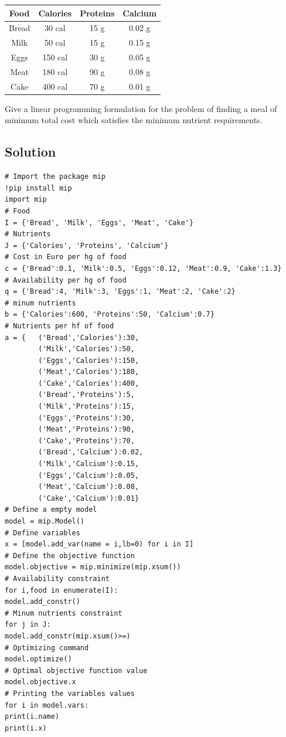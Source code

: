 \documentclass[12pt, a4paper]{report}
\begin{document}
        \begin{table}[H]
            \centering
            \begin{tabular}{|cccc|}
            \hline
            \textbf{Food}               & \textbf{Calories}            & \textbf{Proteins}         & \textbf{Calcium} \\ \hline
            \multicolumn{1}{|c|}{Bread} & \multicolumn{1}{c|}{30 cal}  & \multicolumn{1}{c|}{15 g} & 0.02 g           \\
            \multicolumn{1}{|c|}{Milk}  & \multicolumn{1}{c|}{50 cal}  & \multicolumn{1}{c|}{15 g} & 0.15 g           \\
            \multicolumn{1}{|c|}{Eggs}  & \multicolumn{1}{c|}{150 cal} & \multicolumn{1}{c|}{30 g} & 0.05 g           \\
            \multicolumn{1}{|c|}{Meat}  & \multicolumn{1}{c|}{180 cal} & \multicolumn{1}{c|}{90 g} & 0.08 g           \\
            \multicolumn{1}{|c|}{Cake}  & \multicolumn{1}{c|}{400 cal} & \multicolumn{1}{c|}{70 g} & 0.01 g           \\ \hline
            \end{tabular}
        \end{table}
        Give a linear programming formulation for the problem of finding a meal of minimum total cost which satisfies the minimum nutrient requirements.
    \subsection*{Solution}
        \begin{lstlisting}[style=Python]
# Import the package mip
!pip install mip
import mip
# Food
I = {'Bread', 'Milk', 'Eggs', 'Meat', 'Cake'}
# Nutrients
J = {'Calories', 'Proteins', 'Calcium'}
# Cost in Euro per hg of food
c = {'Bread':0.1, 'Milk':0.5, 'Eggs':0.12, 'Meat':0.9, 'Cake':1.3}
# Availability per hg of food
q = {'Bread':4, 'Milk':3, 'Eggs':1, 'Meat':2, 'Cake':2}
# minum nutrients 
b = {'Calories':600, 'Proteins':50, 'Calcium':0.7}
# Nutrients per hf of food
a = {   ('Bread','Calories'):30,
        ('Milk','Calories'):50,
        ('Eggs','Calories'):150,
        ('Meat','Calories'):180,
        ('Cake','Calories'):400,
        ('Bread','Proteins'):5,
        ('Milk','Proteins'):15,
        ('Eggs','Proteins'):30,
        ('Meat','Proteins'):90,
        ('Cake','Proteins'):70,
        ('Bread','Calcium'):0.02,
        ('Milk','Calcium'):0.15,
        ('Eggs','Calcium'):0.05,
        ('Meat','Calcium'):0.08,
        ('Cake','Calcium'):0.01}
# Define a empty model
model = mip.Model()
# Define variables
x = [model.add_var(name = i,lb=0) for i in I]
# Define the objective function
model.objective = mip.minimize(mip.xsum())
# Availability constraint
for i,food in enumerate(I):
model.add_constr()
# Minum nutrients constraint
for j in J:
model.add_constr(mip.xsum()>=)
# Optimizing command
model.optimize()
# Optimal objective function value
model.objective.x
# Printing the variables values
for i in model.vars:
print(i.name)
print(i.x)
        \end{lstlisting}
    
\end{document}
